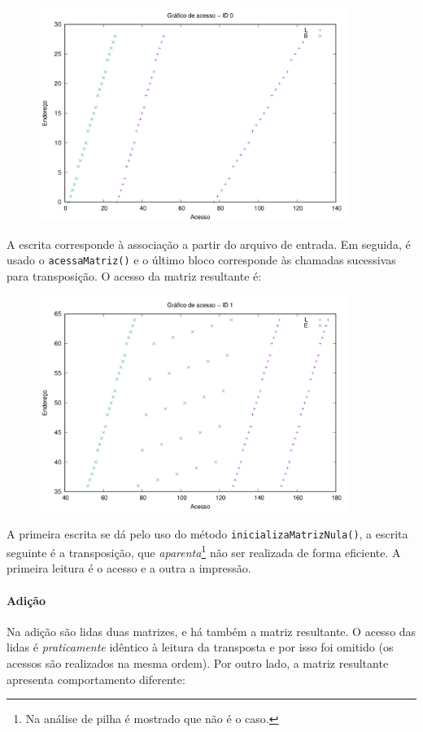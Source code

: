 \documentclass{article}
\def\code#1{\texttt{#1}}
\begin{document}
\begin{figure} [H]
    \includegraphics[width=10cm]{t-acesso-0.png} 
    \centering
\end{figure}

A escrita corresponde à associação a partir do arquivo de entrada. Em seguida, é usado o \code{acessaMatriz()} e o último bloco corresponde às chamadas sucessivas para transposição. O acesso da matriz resultante é:

\begin{figure} [H]
    \includegraphics[width=10cm]{t-acesso-1.png} 
    \centering
\end{figure}

A primeira escrita se dá pelo uso do método \code{inicializaMatrizNula()}, a escrita seguinte é a transposição, que \textit{aparenta}\footnote{Na análise de pilha é mostrado que não é o caso.} não ser realizada de forma eficiente. A primeira leitura é o acesso e a outra a impressão.

\paragraph{Adição} Na adição são lidas duas matrizes, e há também a matriz resultante. O acesso das lidas é \textit{praticamente} idêntico à leitura da transposta e por isso foi omitido (os acessos são realizados na mesma ordem). Por outro lado, a matriz resultante apresenta comportamento diferente:
\end{document}
